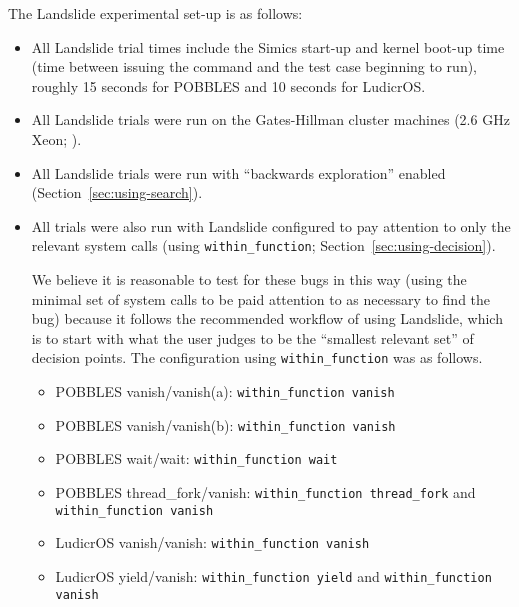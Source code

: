 The Landslide experimental set-up is as follows:

\begin{itemize}
	\item All Landslide trial times include the Simics start-up and kernel boot-up time (time between issuing the command and the test case beginning to run), roughly 15 seconds for POBBLES and 10 seconds for LudicrOS.
	\item All Landslide trials were run on the Gates-Hillman cluster machines (2.6 GHz Xeon; ).
	\item All Landslide trials were run with ``backwards exploration'' enabled (Section~\ref{sec:using-search}).
	\item All trials were also run with Landslide configured to pay attention to only the relevant system calls (using \texttt{within\_function}; Section~\ref{sec:using-decision}).

	We believe it is reasonable to test for these bugs in this way (using the minimal set of system calls to be paid attention to as necessary to find the bug) because it follows the recommended workflow of using Landslide, which is to start with what the user judges to be the ``smallest relevant set'' of decision points. The configuration using \texttt{within\_function} was as follows.
	{\small
	\begin{itemize}
		\item POBBLES vanish/vanish(a): \texttt{within\_function vanish}
		\item POBBLES vanish/vanish(b): \texttt{within\_function vanish}
		\item POBBLES wait/wait: \texttt{within\_function wait}
		\item POBBLES thread\_fork/vanish: \texttt{within\_function thread\_fork} and \texttt{within\_function vanish}
		\item LudicrOS vanish/vanish: \texttt{within\_function vanish}
		\item LudicrOS yield/vanish: \texttt{within\_function yield} and \texttt{within\_function vanish}
	\end{itemize}
	}
\end{itemize}

%

